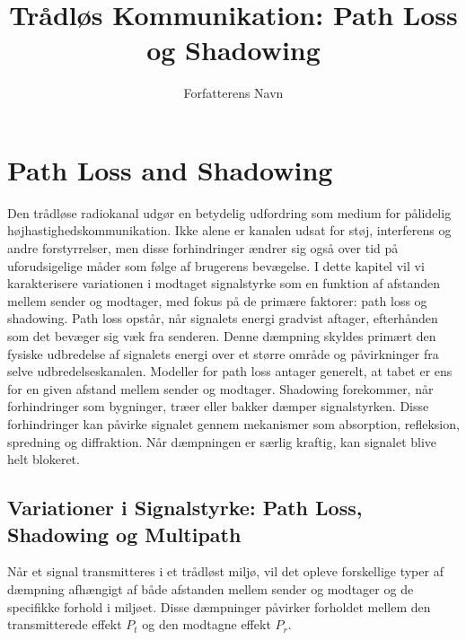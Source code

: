 \documentclass[a4paper,12pt]{book}
\title{Trådløs Kommunikation: Path Loss og Shadowing}
\author{Forfatterens Navn}
\begin{document}
	
	\maketitle
	\tableofcontents
	\clearpage
	
	\chapter{Path Loss and Shadowing}
	Den trådløse radiokanal udgør en betydelig udfordring som medium for pålidelig højhastighedskommunikation. Ikke alene er kanalen udsat for støj, interferens og andre forstyrrelser, men disse forhindringer ændrer sig også over tid på uforudsigelige måder som følge af brugerens bevægelse. I dette kapitel vil vi karakterisere variationen i modtaget signalstyrke som en funktion af afstanden mellem sender og modtager, med fokus på de primære faktorer: path loss og shadowing.
	\newline\newline\noindent
	Path loss opstår, når signalets energi gradvist aftager, efterhånden som det bevæger sig væk fra senderen. Denne dæmpning skyldes primært den fysiske udbredelse af signalets energi over et større område og påvirkninger fra selve udbredelseskanalen. Modeller for path loss antager generelt, at tabet er ens for en given afstand mellem sender og modtager.
	\newline\newline\noindent
	Shadowing forekommer, når forhindringer som bygninger, træer eller bakker dæmper signalstyrken. Disse forhindringer kan påvirke signalet gennem mekanismer som absorption, refleksion, spredning og diffraktion. Når dæmpningen er særlig kraftig, kan signalet blive helt blokeret.
	
	\section{Variationer i Signalstyrke: Path Loss, Shadowing og Multipath}
	Når et signal transmitteres i et trådløst miljø, vil det opleve forskellige typer af dæmpning afhængigt af både afstanden mellem sender og modtager og de specifikke forhold i miljøet. Disse dæmpninger påvirker forholdet mellem den transmitterede effekt \( P_t \) og den modtagne effekt \( P_r \).
	
\end{document}
